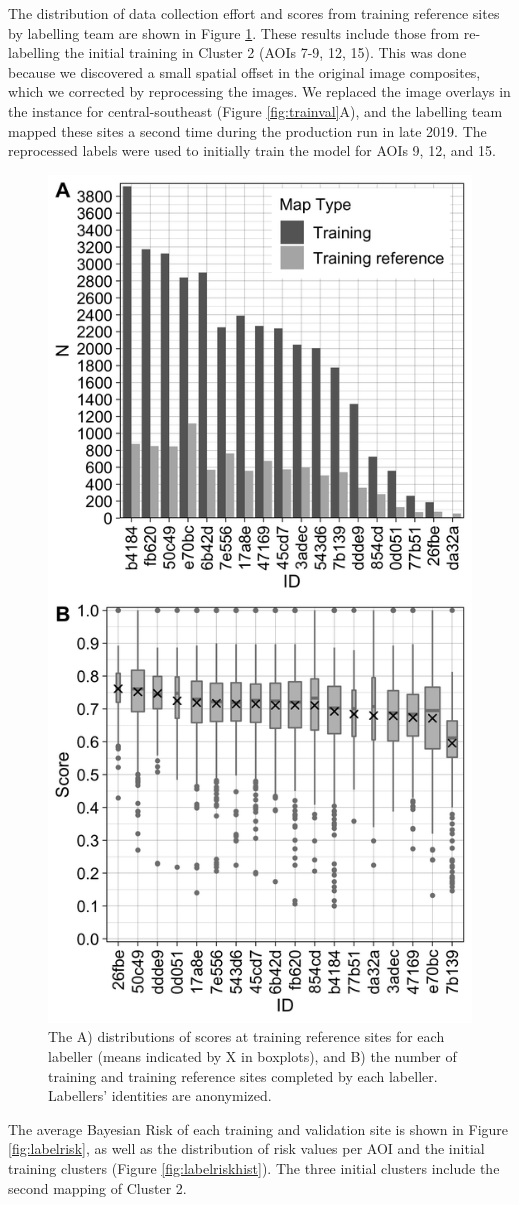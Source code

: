 \documentclass[
  11pt,
  a4paper]{article}
\begin{document}
The distribution of data collection effort and scores from training
reference sites by labelling team are shown in Figure
\ref{fig:trainqual}. These results include those from re-labelling the
initial training in Cluster 2 (AOIs 7-9, 12, 15). This was done because
we discovered a small spatial offset in the original image composites,
which we corrected by reprocessing the images. We replaced the image
overlays in the instance for central-southeast (Figure
\ref{fig:trainval}A), and the labelling team mapped these sites a second
time during the production run in late 2019. The reprocessed labels were
used to initially train the model for AOIs 9, 12, and 15.

\begin{figure}[!ht]

{\centering \includegraphics[width=0.5\linewidth,]{figures/si_training_qual_n} 

}

\caption{The A) distributions of scores at training reference sites for each labeller (means indicated by X in boxplots), and B) the number of training and training reference sites completed by each labeller. Labellers' identities are anonymized.}\label{fig:trainqual}
\end{figure}

The average Bayesian Risk of each training and validation site is shown
in Figure \ref{fig:labelrisk}, as well as the distribution of risk
values per AOI and the initial training clusters (Figure
\ref{fig:labelriskhist}). The three initial clusters include the second
mapping of Cluster 2.
\end{document}
